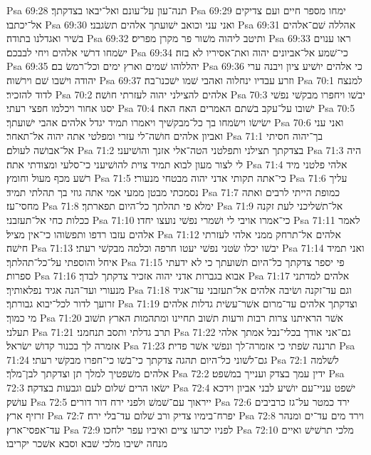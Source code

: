Psa 69:28  תנה־עון על־עונם ואל־יבאו בצדקתך׃
Psa 69:29  ימחו מספר חיים ועם צדיקים אל־יכתבו׃
Psa 69:30  ואני עני וכואב ישׁועתך אלהים תשׂגבני׃
Psa 69:31  אהללה שׁם־אלהים בשׁיר ואגדלנו בתודה׃
Psa 69:32  ותיטב ליהוה משׁור פר מקרן מפריס׃
Psa 69:33  ראו ענוים ישׂמחו דרשׁי אלהים ויחי לבבכם׃
Psa 69:34  כי־שׁמע אל־אביונים יהוה ואת־אסיריו לא בזה׃
Psa 69:35  יהללוהו שׁמים וארץ ימים וכל־רמשׂ בם׃
Psa 69:36  כי אלהים יושׁיע ציון ויבנה ערי יהודה וישׁבו שׁם וירשׁוה׃
Psa 69:37  וזרע עבדיו ינחלוה ואהבי שׁמו ישׁכנו־בה׃
Psa 70:1  למנצח לדוד להזכיר׃
Psa 70:2  אלהים להצילני יהוה לעזרתי חושׁה׃
Psa 70:3  יבשׁו ויחפרו מבקשׁי נפשׁי יסגו אחור ויכלמו חפצי רעתי׃
Psa 70:4  ישׁובו על־עקב בשׁתם האמרים האח האח׃
Psa 70:5  ישׂישׂו וישׂמחו בך כל־מבקשׁיך ויאמרו תמיד יגדל אלהים אהבי ישׁועתך׃
Psa 70:6  ואני עני ואביון אלהים חושׁה־לי עזרי ומפלטי אתה יהוה אל־תאחר׃
Psa 71:1  בך־יהוה חסיתי אל־אבושׁה לעולם׃
Psa 71:2  בצדקתך תצילני ותפלטני הטה־אלי אזנך והושׁיעני׃
Psa 71:3  היה לי לצור מעון לבוא תמיד צוית להושׁיעני כי־סלעי ומצודתי אתה׃
Psa 71:4  אלהי פלטני מיד רשׁע מכף מעול וחומץ׃
Psa 71:5  כי־אתה תקותי אדני יהוה מבטחי מנעורי׃
Psa 71:6  עליך נסמכתי מבטן ממעי אמי אתה גוזי בך תהלתי תמיד׃
Psa 71:7  כמופת הייתי לרבים ואתה מחסי־עז׃
Psa 71:8  ימלא פי תהלתך כל־היום תפארתך׃
Psa 71:9  אל־תשׁליכני לעת זקנה ככלות כחי אל־תעזבני׃
Psa 71:10  כי־אמרו אויבי לי ושׁמרי נפשׁי נועצו יחדו׃
Psa 71:11  לאמר אלהים עזבו רדפו ותפשׂוהו כי־אין מציל׃
Psa 71:12  אלהים אל־תרחק ממני אלהי לעזרתי חישׁה׃
Psa 71:13  יבשׁו יכלו שׂטני נפשׁי יעטו חרפה וכלמה מבקשׁי רעתי׃
Psa 71:14  ואני תמיד איחל והוספתי על־כל־תהלתך׃
Psa 71:15  פי יספר צדקתך כל־היום תשׁועתך כי לא ידעתי ספרות׃
Psa 71:16  אבוא בגברות אדני יהוה אזכיר צדקתך לבדך׃
Psa 71:17  אלהים למדתני מנעורי ועד־הנה אגיד נפלאותיך׃
Psa 71:18  וגם עד־זקנה ושׂיבה אלהים אל־תעזבני עד־אגיד זרועך לדור לכל־יבוא גבורתך׃
Psa 71:19  וצדקתך אלהים עד־מרום אשׁר־עשׂית גדלות אלהים מי כמוך׃
Psa 71:20  אשׁר הראיתנו צרות רבות ורעות תשׁוב תחיינו ומתהמות הארץ תשׁוב תעלני׃
Psa 71:21  תרב גדלתי ותסב תנחמני׃
Psa 71:22  גם־אני אודך בכלי־נבל אמתך אלהי אזמרה לך בכנור קדושׁ ישׂראל׃
Psa 71:23  תרננה שׂפתי כי אזמרה־לך ונפשׁי אשׁר פדית׃
Psa 71:24  גם־לשׁוני כל־היום תהגה צדקתך כי־בשׁו כי־חפרו מבקשׁי רעתי׃
Psa 72:1  לשׁלמה אלהים משׁפטיך למלך תן וצדקתך לבן־מלך׃
Psa 72:2  ידין עמך בצדק וענייך במשׁפט׃
Psa 72:3  ישׂאו הרים שׁלום לעם וגבעות בצדקה׃
Psa 72:4  ישׁפט עניי־עם יושׁיע לבני אביון וידכא עושׁק׃
Psa 72:5  ייראוך עם־שׁמשׁ ולפני ירח דור דורים׃
Psa 72:6  ירד כמטר על־גז כרביבים זרזיף ארץ׃
Psa 72:7  יפרח־בימיו צדיק ורב שׁלום עד־בלי ירח׃
Psa 72:8  וירד מים עד־ים ומנהר עד־אפסי־ארץ׃
Psa 72:9  לפניו יכרעו ציים ואיביו עפר ילחכו׃
Psa 72:10  מלכי תרשׁישׁ ואיים מנחה ישׁיבו מלכי שׁבא וסבא אשׁכר יקריבו׃
